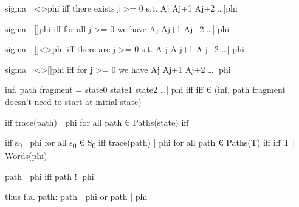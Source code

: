 \documentclass[landscape, a4paper]{article}
\begin{document}
\begin{minipage}[t]{0.19\linewidth}
\begin{betterlist}
		\item sigma |\raisebox{0.5mm}{=} <>phi iff there exists j >= 0 s.t. Aj Aj+1 Aj+2 \ldots |\raisebox{0.5mm}{=}phi
		\item sigma |\raisebox{0.5mm}{=} []phi iff for all j >= 0 we have Aj Aj+1 Aj+2 \ldots |\raisebox{0.5mm}{=} phi
		\item sigma |\raisebox{0.5mm}{=} []<>phi iff there are  j >= 0 s.t. A j A j+1 A j+2 \ldots |\raisebox{0.5mm}{=} phi
		\item sigma |\raisebox{0.5mm}{=} <>[]phi iff for  j >= 0 we have Aj Aj+1 Aj+2 \ldots |\raisebox{0.5mm}{=} phi
		\item inf. path fragment = state0 state1 state2  \ldots |\raisebox{0.4mm}{=} phi iff \raisebox{0.4mm}{=}  iff €  (inf. path fragment doesn't need to start at initial state)
		\item {}\raisebox{0.4mm}{=}  iff trace(path) |\raisebox{0.4mm}{=} phi for all path € Paths(state) iff \raisebox{0.3mm}{=} 
		\item {}\raisebox{0.4mm}{=}  iff s\textsubscript{0} |\raisebox{0.4mm}{=} phi for all s\textsubscript{0} € S\textsubscript{0} iff trace(path) |\raisebox{0.4mm}{=} phi for all path € Paths(T) iff \raisebox{0.3mm}{=} iff T |\raisebox{0.4mm}{=} Words(phi)
		\item path |\raisebox{0.4mm}{=} \raisebox{-0.4mm}{\~{}}phi iff path !|\raisebox{0.4mm}{=} phi
		\begin{betterlist}
			\item thus f.a. path: path |\raisebox{0.4mm}{=} phi or path |\raisebox{0.4mm}{=} \raisebox{-0.4mm}{\~{}}phi

\end{betterlist}
\end{betterlist}
\end{minipage}
\end{document}
